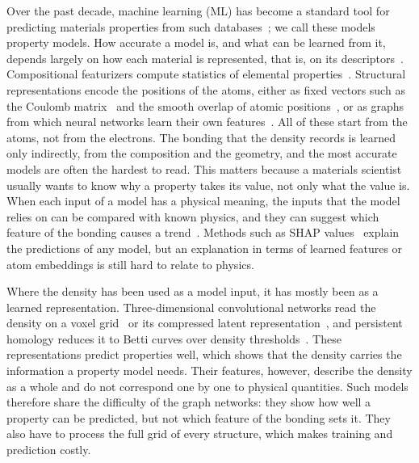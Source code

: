 \documentclass[journal=jctcce,manuscript=article,email=true]{achemso}
\newcommand{\rev}[1]{{\color{blue}#1}}
\begin{document}
Over the past decade, machine learning (ML) has become a standard tool for
predicting materials properties from such databases~\cite{butler2018,schmidt2019};
we call these models property models.
How accurate a model is, and what can be learned from it, depends largely on how
each material is represented, that is, on its descriptors~\cite{ghiringhelli2015}.
Compositional featurizers compute statistics of elemental
properties~\cite{ward2016,ward2018}. Structural representations encode the
positions of the atoms, either as fixed vectors such as the Coulomb
matrix~\cite{rupp2012} and the smooth overlap of atomic
positions~\cite{bartok2013}, or as graphs from which neural networks learn their
own features~\cite{xie2018,chen2019,choudhary2021,wen2024}. All of these start
from the atoms, not from the electrons. The bonding that the density records is
learned only indirectly, from the composition and the geometry, and the most
accurate models are often the hardest to read. This matters because a materials scientist usually wants to know why
a property takes its value, not only what the value is. When each input of a model
has a physical meaning, the inputs that the model relies on can be compared with
known physics, and they can suggest which feature of the bonding causes a
trend~\cite{rudin2019}. Methods such as SHAP
values~\rev{\cite{lundberg2017}} explain the predictions of any model, but an
explanation in terms of learned features or atom embeddings is still hard to
relate to physics.

Where the density has been used as a model input, it has mostly been as a
learned representation. Three-dimensional convolutional networks read the
density on a voxel grid~\cite{kajita2017,zhao2020} or its compressed latent
representation~\cite{kumar2026}, and persistent homology reduces it to Betti
curves over density thresholds~\cite{szymanski2025}. These representations
predict properties well, which shows that the density carries the information
a property model needs. Their features, however, \rev{describe the density as a
whole and do not correspond one by one to physical quantities}. Such models therefore share the difficulty of the graph networks: they
show how well a property can be predicted, but not which feature of the bonding
sets it. They also have to process the full grid of every structure, which makes
training and prediction costly.
\end{document}
